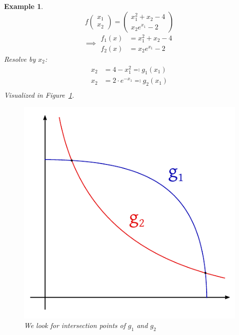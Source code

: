 \documentclass[a4paper]{article}
\newcounter{lecref}[section]
\numberwithin{lecref}{section}
\theoremstyle{break}
\newtheorem{example}[lecref]{Example}
\begin{document}
\begin{example}
  \label{ex:6-1}
  \[ f\begin{pmatrix} x_1 \\ x_2 \end{pmatrix} = \begin{pmatrix} x_1^2 + x_2 - 4 \\ x_2 e^{x_1} - 2 \end{pmatrix} \]
  \[
    \implies \begin{array}{cc}
      f_1(x) &= x_1^2 + x_2 - 4 \\
      f_2(x) &= x_2 e^{x_1} - 2
    \end{array}
  \]
  Resolve by $x_2$:
  \begin{align*}
    x_2 &= 4 - x_1^2 \eqqcolon g_1(x_1) \\
    x_2 &= 2 \cdot e^{-x_1} \eqqcolon g_2(x_1) \\
  \end{align*}
  Visualized in Figure~\ref{img:intersection}.
  
  \begin{figure}[!ht]
    \begin{center}
      \includegraphics{img/intersection.pdf}
      \caption{We look for intersection points of $g_1$ and $g_2$}
      \label{img:intersection}
    \end{center}
  \end{figure}


\end{example}
\end{document}
